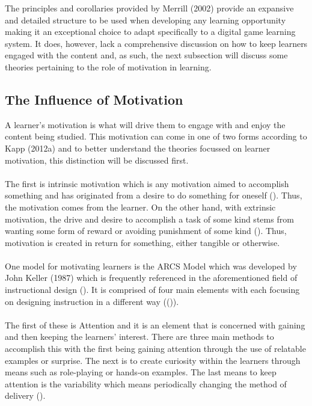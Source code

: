 The principles and corollaries provided by Merrill (2002) provide an expansive and detailed structure to be used when developing any learning opportunity making it an exceptional choice to adapt specifically to a digital game learning system.  It does, however, lack a comprehensive discussion on how to keep learners engaged with the content and, as such, the next subsection will discuss some theories pertaining to the role of motivation in learning.
\newpage
\subsection{The Influence of Motivation}
A learner's motivation is what will drive them to engage with and enjoy the content being studied. This motivation can come in one of two forms according to Kapp (2012a) and to better understand the theories focussed on learner motivation, this distinction will be discussed first.
\\\\
The first is intrinsic motivation which is any motivation aimed to accomplish something and has originated from a desire to do something for oneself (\cite{Kapp2012a}). Thus, the motivation comes from the learner. On the other hand, with extrinsic motivation, the drive and desire to accomplish a task of some kind stems from wanting some form of reward or avoiding punishment of some kind (\cite{Kapp2012a}). Thus, motivation is created in return for something, either tangible or otherwise. 
\\\\
One model for motivating learners is the ARCS Model which was developed by John Keller (1987) which is frequently referenced in the aforementioned field of instructional design (\cite{Kapp2012a}). It is comprised of four main elements with each focusing on designing instruction in a different way ((\cite{Kapp2012a, keller1987development})). 
\\\\
The first of these is Attention and it is an element that is concerned with gaining and then keeping the learners’ interest. There are three main methods to accomplish this with the first being gaining attention through the use of relatable examples or surprise. The next is to create curiosity within the learners through means such as role-playing or hands-on examples. The last means to keep attention is the variability which means periodically changing the method of delivery (\cite{Kapp2012a, keller1987development}).
\\\\
